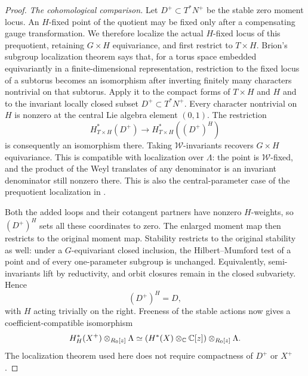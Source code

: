 \begin{proof}
\emph{The cohomological comparison.}
Let $D^+\subset T^*N^+$ be the stable zero moment locus.  An $H$-fixed
point of the quotient may be fixed only after a compensating gauge
transformation.  We therefore localize the actual $H$-fixed locus of this
prequotient, retaining $G\times H$ equivariance, and first restrict to
$T\times H$.  Brion's subgroup localization theorem
\cite[Lemma~4]{Brion98} says that, for a torus space embedded equivariantly in
a finite-dimensional representation, restriction to the fixed locus of a
subtorus becomes an isomorphism after inverting finitely many characters
nontrivial on that subtorus.  Apply it to the compact forms of $T\times H$
and $H$ and to the invariant locally closed subset $D^+\subset T^*N^+$.
Every character nontrivial on $H$ is nonzero at the central Lie algebra
element $(0,1)$.  The restriction
\[
 H^*_{T\times H}(D^+)\longrightarrow H^*_{T\times H}((D^+)^H)
\]
is consequently an isomorphism there.  Taking $\mathcal W$-invariants
recovers $G\times H$ equivariance.  This is compatible with localization
over $\Lambda$: the point is $\mathcal W$-fixed, and the product of the Weyl
translates of any denominator is an invariant denominator still nonzero
there.  This is also the central-parameter case of the prequotient
localization in \cite[Proposition~2.3]{DK25}.

Both the added loops and their cotangent partners have nonzero $H$-weights,
so $(D^+)^H$ sets all these coordinates to zero.  The enlarged moment map
then restricts to the original moment map.  Stability restricts to the
original stability as well: under a $G$-equivariant closed inclusion, the
Hilbert--Mumford test of a point and of every one-parameter subgroup is
unchanged.  Equivalently, semi-invariants lift by reductivity, and orbit
closures remain in the closed subvariety.  Hence
\[
 (D^+)^H=D,
\]
with $H$ acting trivially on the right.  Freeness of the stable actions now
gives a coefficient-compatible isomorphism
\begin{equation}\label{eq:loop-higgs-localization}
 H_H^*(X^+)\otimes_{R_0[z]}\Lambda
    \simeq (H^*(X)\otimes_\mathbb C\mathbb C[z])\otimes_{R_0[z]}\Lambda.
\end{equation}
The localization theorem used here does not require compactness of $D^+$
or $X^+$.


\end{proof}

